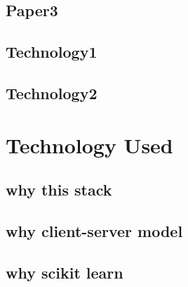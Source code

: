 \subsection{Paper3}
\subsection{Technology1}
\subsection{Technology2}

\section{Technology Used}
\subsection{why this stack}
\subsection{why client-server model}
\subsection{why scikit learn}

\fi
